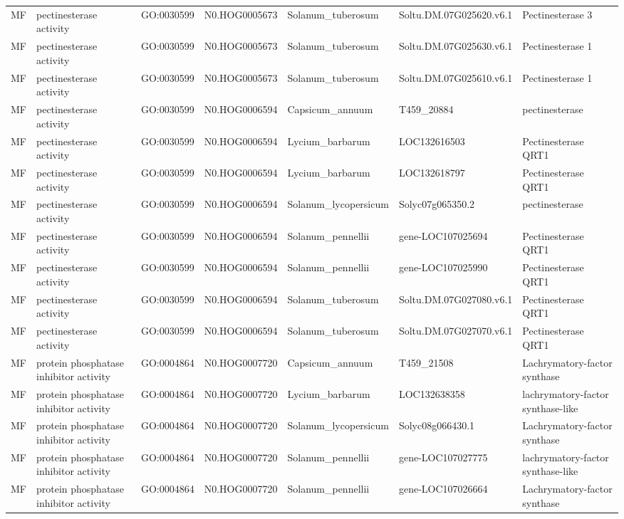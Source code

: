 \begin{table}
\begin{tabular}[t]{lllllll}
MF & pectinesterase activity & GO:0030599 & N0.HOG0005673 & Solanum\_tuberosum & Soltu.DM.07G025620.v6.1 & Pectinesterase 3\\
MF & pectinesterase activity & GO:0030599 & N0.HOG0005673 & Solanum\_tuberosum & Soltu.DM.07G025630.v6.1 & Pectinesterase 1\\
MF & pectinesterase activity & GO:0030599 & N0.HOG0005673 & Solanum\_tuberosum & Soltu.DM.07G025610.v6.1 & Pectinesterase 1\\
MF & pectinesterase activity & GO:0030599 & N0.HOG0006594 & Capsicum\_annuum & T459\_20884 & pectinesterase\\
MF & pectinesterase activity & GO:0030599 & N0.HOG0006594 & Lycium\_barbarum & LOC132616503 & Pectinesterase QRT1\\
MF & pectinesterase activity & GO:0030599 & N0.HOG0006594 & Lycium\_barbarum & LOC132618797 & Pectinesterase QRT1\\
MF & pectinesterase activity & GO:0030599 & N0.HOG0006594 & Solanum\_lycopersicum & Solyc07g065350.2 & pectinesterase\\
MF & pectinesterase activity & GO:0030599 & N0.HOG0006594 & Solanum\_pennellii & gene-LOC107025694 & Pectinesterase QRT1\\
MF & pectinesterase activity & GO:0030599 & N0.HOG0006594 & Solanum\_pennellii & gene-LOC107025990 & Pectinesterase QRT1\\
MF & pectinesterase activity & GO:0030599 & N0.HOG0006594 & Solanum\_tuberosum & Soltu.DM.07G027080.v6.1 & Pectinesterase QRT1\\
MF & pectinesterase activity & GO:0030599 & N0.HOG0006594 & Solanum\_tuberosum & Soltu.DM.07G027070.v6.1 & Pectinesterase QRT1\\
MF & protein phosphatase inhibitor activity & GO:0004864 & N0.HOG0007720 & Capsicum\_annuum & T459\_21508 & Lachrymatory-factor synthase\\
MF & protein phosphatase inhibitor activity & GO:0004864 & N0.HOG0007720 & Lycium\_barbarum & LOC132638358 & lachrymatory-factor synthase-like\\
MF & protein phosphatase inhibitor activity & GO:0004864 & N0.HOG0007720 & Solanum\_lycopersicum & Solyc08g066430.1 & Lachrymatory-factor synthase\\
MF & protein phosphatase inhibitor activity & GO:0004864 & N0.HOG0007720 & Solanum\_pennellii & gene-LOC107027775 & lachrymatory-factor synthase-like\\
MF & protein phosphatase inhibitor activity & GO:0004864 & N0.HOG0007720 & Solanum\_pennellii & gene-LOC107026664 & Lachrymatory-factor synthase\\

\end{tabular}
\end{table}
